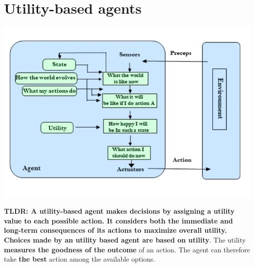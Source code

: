 \documentclass{article}
\begin{document}
\newpage

\section{Utility-based agents}

\begin{center}
    \includegraphics[scale=0.4]{images/utility_based_agent.jpg}
\end{center}

\textbf{TLDR: A utility-based agent makes decisions by assigning a utility value to each possible action. It considers both the immediate and long-term consequences of its actions to maximize overall utility.} \\

\textbf{Choices made by an utility based agent are based on utility}. The utility \textbf{measures the goodness of the outcome} of an action. The agent can therefore take \textbf{the best} action among the available options. \\

\end{document}
